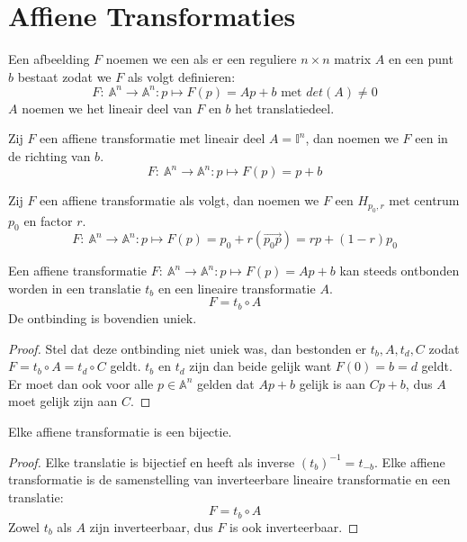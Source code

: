 \documentclass[main.tex]{subfiles}
\begin{document}
\chapter{Affiene Transformaties}
\label{cha:affiene-transformaties}

\begin{de}
  Een afbeelding $F$ noemen we een  als er een reguliere $n\times n$ matrix $A$ en een punt $b$ bestaat zodat we $F$ als volgt definieren:
  \[ F:\ \mathbb{A}^{n} \rightarrow \mathbb{A}^{n}: p \mapsto F(p) = Ap + b \text{ met } det(A) \neq 0 \]
  $A$ noemen we het lineair deel van $F$ en $b$ het translatiedeel.
\end{de}

\begin{de}
  Zij $F$ een affiene transformatie met lineair deel $A=\mathbb{I}^{n}$, dan noemen we $F$ een  in de richting van $b$.
  \[ F:\ \mathbb{A}^{n} \rightarrow \mathbb{A}^{n}: p \mapsto F(p) = p + b \]
\end{de}

\begin{de}
  Zij $F$ een affiene transformatie als volgt, dan noemen we $F$ een  $H_{p_{0},r}$ met centrum $p_{0}$ en factor $r$.
  \[ F:\ \mathbb{A}^{n} \rightarrow \mathbb{A}^{n}: p \mapsto F(p) = p_{0} + r(\overrightarrow{p_{0}p}) = rp + (1-r)p_{0} \]
\end{de}


\begin{st}
  Een affiene transformatie $F:\ \mathbb{A}^{n} \rightarrow \mathbb{A}^{n}: p \mapsto F(p) = Ap + b$ kan steeds ontbonden worden in een translatie $t_{b}$ en een lineaire transformatie $A$.
  \[ F = t_{b} \circ A \]
  De ontbinding is bovendien uniek.

  \begin{proof}
    Stel dat deze ontbinding niet uniek was, dan bestonden er $t_{b},A,t_{d},C$ zodat $F = t_{b}\circ A = t_{d} \circ C$ geldt.
    $t_{b}$ en $t_{d}$ zijn dan beide gelijk want $F(0) = b = d$ geldt.
    Er moet dan ook voor alle $p\in \mathbb{A}^{n}$ gelden dat $Ap+b$ gelijk is aan $Cp+b$, dus $A$ moet gelijk zijn aan $C$.
  \end{proof}
\end{st}

\begin{st}
  Elke affiene transformatie is een bijectie.

  \begin{proof}
    Elke translatie is bijectief en heeft als inverse $(t_{b})^{-1} = t_{-b}$.
    Elke affiene transformatie is de samenstelling van inverteerbare lineaire transformatie en een translatie:
    \[ F = t_{b} \circ A \]
    Zowel $t_{b}$ als $A$ zijn inverteerbaar, dus $F$ is ook inverteerbaar.
  \end{proof}
\end{st}
\end{document}
